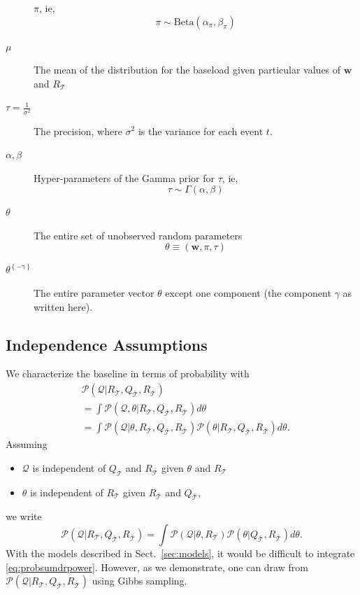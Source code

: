 \documentclass[journal]{IEEEtran}
\newcommand{\prob}{\mathcal{P}}
\newcommand{\eventset}{\mathcal{T}}
\newcommand{\wvector}{\mathbf w}
\newcommand{\context}{{\bar {\mathcal{T}}}}
\newcommand{\drpower}{Q}
\newcommand{\sumdrpower}{{\mathcal{Q}}}
\newcommand{\referencepower}{R}
\newcommand{\outdr}{\drpower_\context}
\newcommand{\inreference}{\referencepower_\eventset}
\newcommand{\outreference}{\referencepower_\context}
\newcommand{\thetasans}[1]{\theta^{\left\{-#1\right\}}}
\begin{document}
\begin{description}
  $\pi$, ie,
  \begin{equation*}
    \pi \sim \text{Beta}(\alpha_\pi, \beta_\pi )
  \end{equation*}
\item[$\mu$] The mean of the distribution for the baseload given
  particular values of $\wvector$ and $\inreference$
\item[$\tau = \frac{1}{\sigma^2}$] The precision, where $\sigma^2$ is
  the variance for each event $t$.
\item[$\alpha, \beta$] Hyper-parameters of the Gamma prior for $\tau$,
  ie,
  \begin{equation*}
    \tau \sim \Gamma(\alpha, \beta)
  \end{equation*}
\item[$\theta$] The entire set of unobserved random parameters
  \begin{equation*}
    \theta \equiv \left(\wvector, \pi, \tau \right)
  \end{equation*}
\item[$\thetasans{\gamma}$] The entire parameter vector $\theta$
  except one component (the component $\gamma$ as written here).
\end{description}

\subsection{Independence Assumptions}
\label{sec:Independence}

We characterize the baseline in terms of probability with
\begin{align*}
  &\prob(\sumdrpower|\inreference, \outdr, \outreference) \\
  &= \int \prob \left( \sumdrpower, \theta |\inreference, \outdr,
    \outreference \right) d\theta \\
  &= \int \prob \left( \sumdrpower | \theta, \inreference, \outdr,
    \outreference \right) \prob \left( \theta| \inreference, \outdr,
    \outreference \right) d\theta.
\end{align*}
Assuming
\begin{itemize}
\item $\sumdrpower$ is independent of $\outdr$ and $\outreference$ given
  $\theta$ and $\inreference$
\item $\theta$ is independent of $\inreference$ given $\outreference$
  and $\outdr$,
\end{itemize}
we write
\begin{equation}
  \label{eq:probsumdrpower}
  \prob(\sumdrpower|\inreference, \outdr, \outreference) = \int \prob \left(
    \sumdrpower | \theta, \inreference \right) \prob \left( \theta| \outdr,
    \outreference \right) d\theta.
\end{equation}
With the models described in Sect.~\ref{sec:models}, it would be
difficult to integrate \eqref{eq:probsumdrpower}.  However, as we
demonstrate, one can draw from
$\prob(\sumdrpower|\inreference, \outdr, \outreference)$ using Gibbs
sampling.
\end{document}
